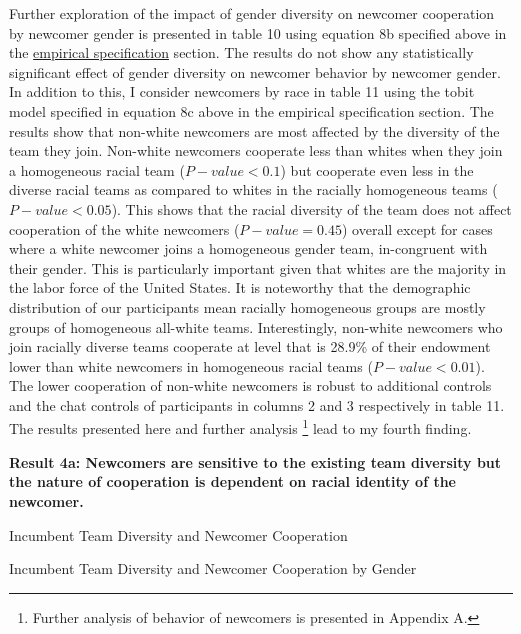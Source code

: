  Further exploration of the impact of gender diversity on newcomer cooperation by newcomer gender is presented in table 10 using equation 8b specified above in the \hyperref[subsec:Specification]{empirical specification} section. The results do not show any statistically significant effect of gender diversity on newcomer behavior by newcomer gender. In addition to this, I consider newcomers by race in table 11 using the tobit model specified in equation 8c above in the empirical specification section. The results show that non-white newcomers are most affected by the diversity of the team they join. Non-white newcomers cooperate less than whites when they join a homogeneous racial team ($P-value<0.1$) but cooperate even less in the diverse racial teams as compared to whites in the racially homogeneous teams ($P-value<0.05$). This shows that the racial diversity of the team does not affect cooperation of the white newcomers ($P-value=0.45$) overall except for cases where a white newcomer joins a homogeneous gender team, in-congruent with their gender. This is particularly important given that whites are the majority in the labor force of the United States\citep{b21}. It is noteworthy that the demographic distribution of our participants mean racially homogeneous groups are mostly groups of homogeneous all-white teams. Interestingly, non-white newcomers who join racially diverse teams cooperate at level that is 28.9\% of their endowment lower than white newcomers in homogeneous racial teams ($P-value<0.01$). The lower cooperation of non-white newcomers is robust to additional controls and the chat controls of participants in columns 2 and 3 respectively in table 11. The results presented here and further analysis \footnote{Further analysis of behavior of newcomers is presented in Appendix A.} lead to my fourth finding.   

\textbf{Result 4a: Newcomers are sensitive to the existing team diversity but the nature of cooperation is dependent on racial identity of the newcomer.}


\begin{table}[H]
 \captionsetup{justification=raggedright,singlelinecheck=false}
\caption{Incumbent Team Diversity and Newcomer Cooperation } \label{tab:table6}
    \begin{center}
        
    \end{center}
\end{table}

\begin{table}[H]
\caption{Incumbent Team Diversity and Newcomer Cooperation by Gender } \label{tab:table6}
    \begin{center}
        
    \end{center}
\end{table}


